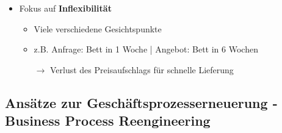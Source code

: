 \begin{itemize}
\begin{itemize}
	\item Fokus auf \textbf{Inflexibilität}
		\begin{itemize}
		\item Viele verschiedene Gesichtspunkte
		\item z.B. Anfrage: Bett in 1 Woche | Angebot: Bett in 6 Wochen
		\item[$\rightarrow$] Verlust des Preisaufschlags für schnelle Lieferung		
		
		\end{itemize}
	
	\end{itemize}
\end{itemize}

\subsection{Ansätze zur Geschäftsprozesserneuerung - Business Process Reengineering}
